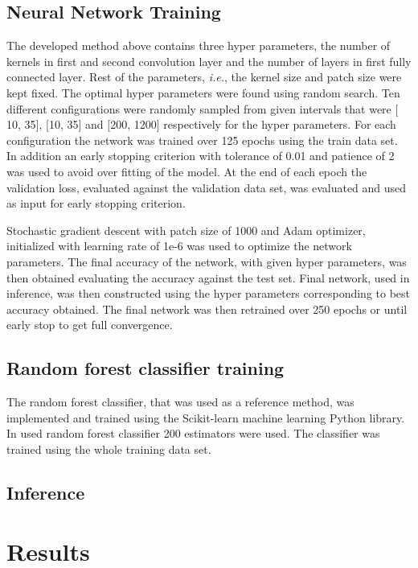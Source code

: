 \documentclass[aps,prb,10pt,twocolumn,groupedaddress]{revtex4-1}
\begin{document}
\subsection{Neural Network Training}
\label{sec:computational_methods_training_neural_network}
The developed method above contains three hyper parameters, the number of kernels in first and second convolution layer and the number of layers in first fully connected layer. Rest of the parameters, \textit{i.e.}, the kernel size and patch size were kept fixed. The optimal hyper parameters were found using random search. Ten different configurations were randomly sampled from given intervals that were $\lbrack$10, 35$\rbrack$, $\lbrack$10, 35$\rbrack$ and $\lbrack$200, 1200$\rbrack$ respectively for the hyper parameters. For each configuration the network was trained over 125 epochs using the train data set. In addition an early stopping criterion with tolerance of 0.01 and patience of 2 was used to avoid over fitting of the model. At the end of each epoch the validation loss, evaluated against the validation data set, was evaluated and used as input for early stopping criterion.

Stochastic gradient descent with patch size of 1000 and Adam optimizer\cite{adam}, initialized with learning rate of 1e-6 was used to optimize the network parameters. The final accuracy of the network, with given hyper parameters, was then obtained evaluating the accuracy against the test set. Final network, used in inference, was then constructed using the hyper parameters corresponding to best accuracy obtained. The final network was then retrained over 250 epochs or until early stop to get full convergence.

\subsection{Random forest classifier training}
\label{sec:computational_methods_training_random_forest}
The random forest classifier, that was used as a reference method, was implemented and trained using the Scikit-learn machine learning Python library. In used random forest classifier 200 estimators were used. The classifier was trained using the whole training data set.

\subsection{Inference}
\label{sec:computational_methods_inference}

\section{Results}
\label{sec:results}
\end{document}

